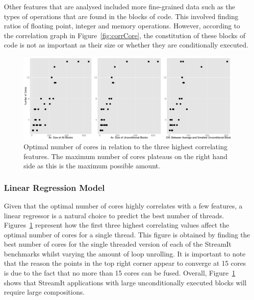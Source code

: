 Other features that are analysed included more fine-grained data such as the types of operations that are found in the blocks of code.
This involved finding ratios of floating point, integer and memory operations.
However, according to the correlation graph in Figure~\ref{fig:corrCore}, the constitution of these blocks of code is not as important as their size or whether they are conditionally executed.

\begin{figure}[t]
  \center
  \includegraphics[width=1\textwidth]{streamit-paper/graphics/lineargraphs.pdf}
  \caption{Optimal number of cores in relation to the three highest correlating features. The maximum number of cores plateaus on the right hand side as this is the maximum possible amount.}\label{fig:maxav}
\end{figure}

\subsubsection{Linear Regression Model}
Given that the optimal number of cores highly correlates with a few features, a linear regressor is a natural choice to predict the best number of threads.
Figures~\ref{fig:maxav} represent how the first three highest correlating values affect the optimal number of cores for a single thread.
This figure is obtained by finding the best number of cores for the single threaded version of each of the StreamIt benchmarks whilst varying the amount of loop unrolling.
It is important to note that the reason the points in the top right corner appear to converge at 15 cores is due to the fact that no more than 15 cores can be fused.
Overall, Figure~\ref{fig:maxav} shows that StreamIt applications with large unconditionally executed blocks will require large compositions.


